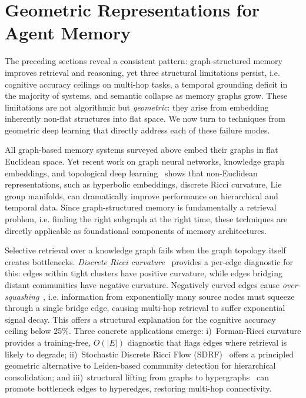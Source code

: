 \documentclass[hf]{ceurart}
\begin{document}
\section{Geometric Representations for Agent Memory}
\label{sec:geometric}

The preceding sections reveal a consistent pattern: graph-structured
memory improves retrieval and reasoning, yet three structural
limitations persist, i.e. cognitive accuracy ceilings on multi-hop tasks,
a temporal grounding deficit in the majority of systems, and
semantic collapse as memory graphs grow. These limitations are not
algorithmic but \emph{geometric}: they arise from embedding
inherently non-flat structures into flat space. We now turn to
techniques from geometric deep learning that directly address each of
these failure modes.

All graph-based memory systems surveyed above embed their graphs in
flat Euclidean space. Yet recent work on graph neural networks,
knowledge graph embeddings, and topological deep
learning~\cite{tdlposition2024} shows that non-Euclidean
representations, such as hyperbolic embeddings, discrete Ricci curvature,
Lie group manifolds, can dramatically improve performance on
hierarchical and temporal data. Since graph-structured memory is
fundamentally a retrieval problem, i.e. finding the right subgraph at the
right time, these techniques are directly applicable as foundational
components of memory architectures.

Selective retrieval over a knowledge graph fails when the graph
topology itself creates bottlenecks. \emph{Discrete Ricci
curvature}~\cite{formanricci2017,topping2022} provides a per-edge
diagnostic for this: edges within tight clusters have positive
curvature, while edges bridging distant communities have negative
curvature. Negatively curved edges cause
\emph{over-squashing}~\cite{alon2021}, i.e. information from
exponentially many source nodes must squeeze through a single bridge
edge, causing multi-hop retrieval to suffer exponential signal
decay. This offers a structural explanation for the cognitive
accuracy ceiling below 25\%. Three concrete applications emerge:
i)~Forman-Ricci curvature provides a training-free, $O(|E|)$
diagnostic that flags edges where retrieval is likely to degrade;
ii)~Stochastic Discrete Ricci Flow (SDRF)~\cite{topping2022} offers
a principled geometric alternative to Leiden-based community
detection for hierarchical consolidation; and iii)~structural lifting
from graphs to
hypergraphs~\cite{banf2025helmholtz,hypergraphricci2024} can promote
bottleneck edges to hyperedges, restoring multi-hop connectivity.
\end{document}
